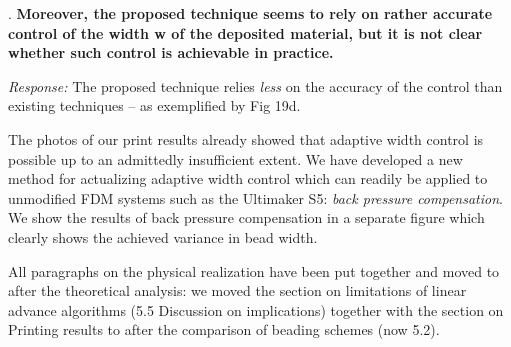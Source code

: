 \documentclass[5p,10pt,times]{elsarticle}
\theoremstyle{definition}
\newcommand{\commits}[1]{{\bf\begin{alltt} {#1}\end{alltt}}}
\renewcommand{\commits}[1]{}
\newcommand\Que[1]{%
   \leavevmode\par
   \refstepcounter{question}
   \noindent
   \thequestion. {\bf#1}\par}
\newcounter{question}
\numberwithin{question}{section}
\newcommand\Ans[2][]{%
    \leavevmode\par\noindent
   {%
    {\it Response:} \textbf{#1}#2\par}}
\begin{document}
\Que{
Moreover, the proposed technique seems to rely on rather accurate control of the width w of the deposited material, but it is not clear whether such control is achievable in practice. 
}\label{s5_prints}
\Ans{
The proposed technique relies \emph{less} on the accuracy of the control than existing techniques – as exemplified by Fig 19d.

The photos of our print results already showed that adaptive width control is possible up to an admittedly insufficient extent.
We have developed a new method for actualizing adaptive width control which can readily be applied to unmodified FDM systems such as the Ultimaker S5: \emph{back pressure compensation}.
We show the results of back pressure compensation in a separate figure which clearly shows the achieved variance in bead width.

All paragraphs on the physical realization have been put together and moved to after the theoretical analysis:
we moved the section on limitations of linear advance algorithms (5.5 Discussion on implications) together with the section on Printing results to after the comparison of beading schemes (now 5.2).
}
\commits{
a0e98d1079b3ab3b262908ea056939813fc49c73 %
6362bb7f1ff11e15efc6667fc7863ca12a29a8a9 %
22cb3664ddc722d25e0a73df905100410f8ebf10 444a00a54100e402024335b79265b6900017bc1d ab38e07c84b6e62dc028d224b7a57bba9239552f cb3325a9cf00457fab5f1bdc5d29f1d178de4e35%
d375878a8a6d01c53436aeb9c473dbedd8f3edcf %
125162ad9878c0fb5a054f1bab34aa7b1353b86c %
34e923fbf4c2ad45bf2dd0a03ef70d4a714b4b0b %
1b7bb61648b97b8084ca8817aa457bde2c91e1b3 %
}
\end{document}
